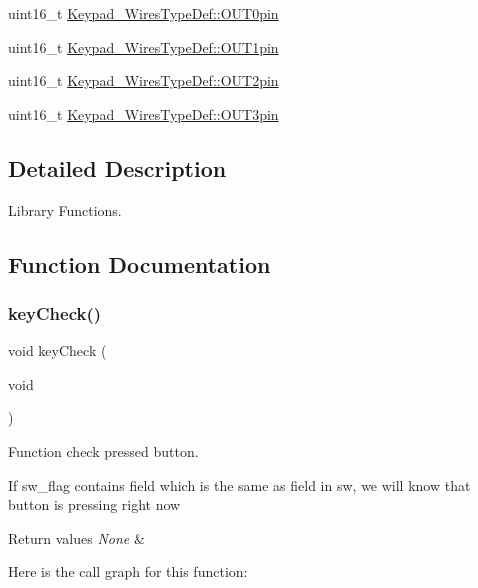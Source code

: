 \begin{DoxyCompactItemize}
\item 
uint16\+\_\+t \hyperlink{group___key_pad___functions_gad84304a16a91fb587c994c959c30a39b}{Keypad\+\_\+\+Wires\+Type\+Def\+::\+O\+U\+T0pin}
\item 
uint16\+\_\+t \hyperlink{group___key_pad___functions_ga49549ddf83137d8740537712453723ae}{Keypad\+\_\+\+Wires\+Type\+Def\+::\+O\+U\+T1pin}
\item 
uint16\+\_\+t \hyperlink{group___key_pad___functions_ga376bc841372e03e107799eadf13cde51}{Keypad\+\_\+\+Wires\+Type\+Def\+::\+O\+U\+T2pin}
\item 
uint16\+\_\+t \hyperlink{group___key_pad___functions_gaaaa4c6e2944f027f8c7eb8d8bc0ee90c}{Keypad\+\_\+\+Wires\+Type\+Def\+::\+O\+U\+T3pin}
\end{DoxyCompactItemize}


\subsection{Detailed Description}
Library Functions. 



\subsection{Function Documentation}
\mbox{\label{group___key_pad___functions_ga3a9e33c6b18f4e6bcdb841ac76286a87}} 
\subsubsection{\texorpdfstring{key\+Check()}{keyCheck()}}
{\footnotesize\ttfamily void key\+Check (\begin{DoxyParamCaption}\item[{void}]{ }\end{DoxyParamCaption})}



Function check pressed button. 

If sw\+\_\+flag contains field which is the same as field in sw, we will know that button is pressing right now 
\begin{DoxyRetVals}{Return values}
{\em None} & \\
\hline
\end{DoxyRetVals}
Here is the call graph for this function\+:
\mbox{\label{group___key_pad___functions_gaaec8bb627a84f20257e155a5c62d6365}} 

